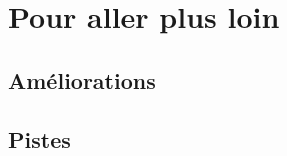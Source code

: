 \documentclass[
]{article}
\begin{document}
\hypertarget{pour-aller-plus-loin}{%
\section{Pour aller plus loin}\label{pour-aller-plus-loin}}

\hypertarget{amuxe9liorations}{%
\subsection{Améliorations}\label{amuxe9liorations}}

\hypertarget{pistes}{%
\subsection{Pistes}\label{pistes}}
\end{document}
